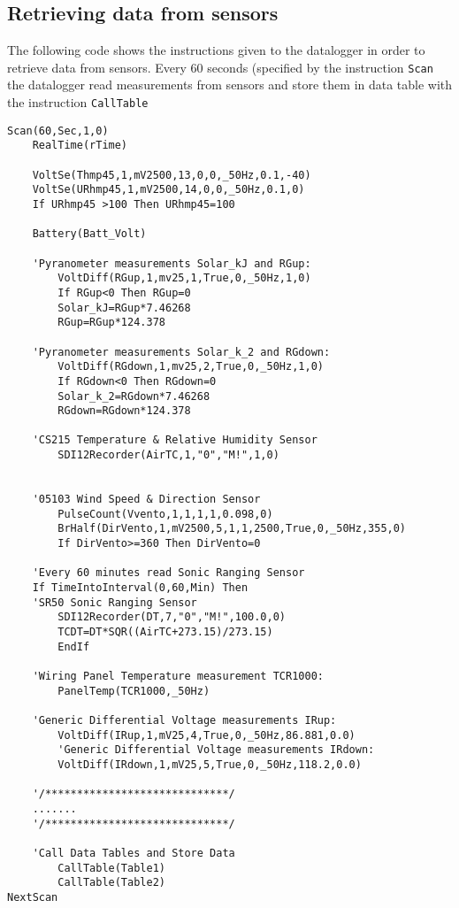 \subsection{Retrieving data from sensors}
The following code shows the instructions given to the datalogger in order to retrieve data from sensors. Every 60 seconds (specified by the instruction {\tt Scan} the datalogger read measurements from sensors and store them in data table with the instruction {\tt CallTable}
\begin{lstlisting}
Scan(60,Sec,1,0)
    RealTime(rTime) 

    VoltSe(Thmp45,1,mV2500,13,0,0,_50Hz,0.1,-40)
    VoltSe(URhmp45,1,mV2500,14,0,0,_50Hz,0.1,0)
    If URhmp45 >100 Then URhmp45=100
    
    Battery(Batt_Volt)    

    'Pyranometer measurements Solar_kJ and RGup:
		VoltDiff(RGup,1,mv25,1,True,0,_50Hz,1,0)
		If RGup<0 Then RGup=0
		Solar_kJ=RGup*7.46268
		RGup=RGup*124.378
		
    'Pyranometer measurements Solar_k_2 and RGdown:
		VoltDiff(RGdown,1,mv25,2,True,0,_50Hz,1,0)
		If RGdown<0 Then RGdown=0
		Solar_k_2=RGdown*7.46268
		RGdown=RGdown*124.378
		
    'CS215 Temperature & Relative Humidity Sensor 
		SDI12Recorder(AirTC,1,"0","M!",1,0)
		
    
    '05103 Wind Speed & Direction Sensor
		PulseCount(Vvento,1,1,1,1,0.098,0)
		BrHalf(DirVento,1,mV2500,5,1,1,2500,True,0,_50Hz,355,0)
		If DirVento>=360 Then DirVento=0
		
    'Every 60 minutes read Sonic Ranging Sensor
    If TimeIntoInterval(0,60,Min) Then
    'SR50 Sonic Ranging Sensor
		SDI12Recorder(DT,7,"0","M!",100.0,0)
		TCDT=DT*SQR((AirTC+273.15)/273.15)
		EndIf
    
    'Wiring Panel Temperature measurement TCR1000:
		PanelTemp(TCR1000,_50Hz)
		
    'Generic Differential Voltage measurements IRup:
		VoltDiff(IRup,1,mV25,4,True,0,_50Hz,86.881,0.0)
		'Generic Differential Voltage measurements IRdown:
		VoltDiff(IRdown,1,mV25,5,True,0,_50Hz,118.2,0.0)
		
    '/*****************************/
    .......
    '/*****************************/
   	
    'Call Data Tables and Store Data
		CallTable(Table1)
		CallTable(Table2)
NextScan
\end{lstlisting}